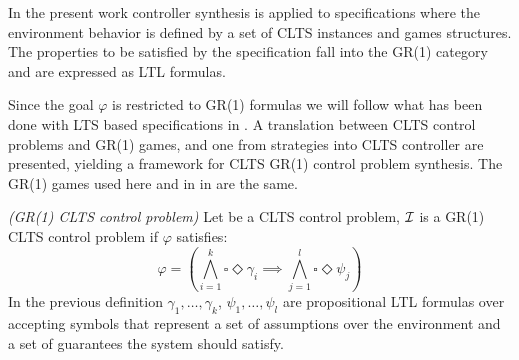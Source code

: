 In the present work controller synthesis is applied to specifications where the environment behavior is defined by a set of CLTS instances and games structures. The properties to be satisfied by the specification fall into the GR(1) category and are expressed as LTL formulas.

Since the goal $\varphi$ is restricted to GR(1) formulas we will follow what has been done with LTS based specifications in \cite{DBLP:phd/ethos/DIppolito13}. A translation between CLTS control problems and GR(1) games, and one from strategies into CLTS controller are presented, yielding a framework for CLTS GR(1) control problem synthesis. The GR(1) games used here and in in \cite{DBLP:phd/ethos/DIppolito13} are the same.

\begin{definition}\label{def:gr1_clts_control_problem} \emph{(GR(1) CLTS control problem)} 
	Let \controlProblemDef be a CLTS control problem, $\mathcal{I}$ is a GR(1) CLTS control problem if $\varphi$ satisfies: 
	\[\varphi = (\bigwedge_{i=1}^k\square \Diamond \gamma_i \implies \bigwedge_{j=1}^l\square \Diamond \psi_j)\]
	In the previous definition $\gamma_1, \ldots , \gamma_k$, $\psi_1, \ldots , \psi_l$ are propositional LTL formulas over accepting symbols that represent a set of assumptions over the environment and a set of guarantees the system should satisfy.
\end{definition}

%

